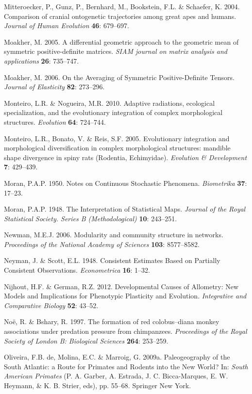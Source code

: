 \documentclass[12pt,twoside]{report}
\begin{document}
Mitteroecker, P., Gunz, P., Bernhard, M., Bookstein, F.L. \& Schaefer,
K. 2004. Comparison of cranial ontogenetic trajectories among great apes
and humans. \emph{Journal of Human Evolution} \textbf{46}: 679--697.

Moakher, M. 2005. A differential geometric approach to the geometric
mean of symmetric positive-definite matrices. \emph{SIAM journal on
matrix analysis and applications} \textbf{26}: 735--747.

Moakher, M. 2006. On the Averaging of Symmetric Positive-Definite
Tensors. \emph{Journal of Elasticity} \textbf{82}: 273--296.

Monteiro, L.R. \& Nogueira, M.R. 2010. Adaptive radiations, ecological
specialization, and the evolutionary integration of complex
morphological structures. \emph{Evolution} \textbf{64}: 724--744.

Monteiro, L.R., Bonato, V. \& Reis, S.F. 2005. Evolutionary integration
and morphological diversification in complex morphological structures:
mandible shape divergence in spiny rats (Rodentia, Echimyidae).
\emph{Evolution \& Development} \textbf{7}: 429--439.

Moran, P.A.P. 1950. Notes on Continuous Stochastic Phenomena.
\emph{Biometrika} \textbf{37}: 17--23.

Moran, P.A.P. 1948. The Interpretation of Statistical Maps.
\emph{Journal of the Royal Statistical Society. Series B
(Methodological)} \textbf{10}: 243--251.

Newman, M.E.J. 2006. Modularity and community structure in networks.
\emph{Proceedings of the National Academy of Sciences} \textbf{103}:
8577--8582.

Neyman, J. \& Scott, E.L. 1948. Consistent Estimates Based on Partially
Consistent Observations. \emph{Econometrica} \textbf{16}: 1--32.

Nijhout, H.F. \& German, R.Z. 2012. Developmental Causes of Allometry:
New Models and Implications for Phenotypic Plasticity and Evolution.
\emph{Integrative and Comparative Biology} \textbf{52}: 43--52.

Noë, R. \& Bshary, R. 1997. The formation of red colobus--diana monkey
associations under predation pressure from chimpanzees.
\emph{Proceedings of the Royal Society of London B: Biological Sciences}
\textbf{264}: 253--259.

Oliveira, F.B. de, Molina, E.C. \& Marroig, G. 2009a. Paleogeography of
the South Atlantic: a Route for Primates and Rodents into the New World?
In: \emph{South American Primates} (P. A. Garber, A. Estrada, J. C.
Bicca-Marques, E. W. Heymann, \& K. B. Strier, eds), pp. 55--68.
Springer New York.
\end{document}
